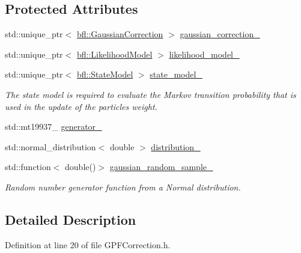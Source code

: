 \subsection*{Protected Attributes}
\begin{DoxyCompactItemize}
\item 
std\+::unique\+\_\+ptr$<$ \mbox{\hyperlink{classbfl_1_1GaussianCorrection}{bfl\+::\+Gaussian\+Correction}} $>$ \mbox{\hyperlink{classbfl_1_1GPFCorrection_a43295a0619fa021b6b314c76f046bae8}{gaussian\+\_\+correction\+\_\+}}
\item 
std\+::unique\+\_\+ptr$<$ \mbox{\hyperlink{classbfl_1_1LikelihoodModel}{bfl\+::\+Likelihood\+Model}} $>$ \mbox{\hyperlink{classbfl_1_1GPFCorrection_aabbf55b6addf12146ffd7da12c5475bf}{likelihood\+\_\+model\+\_\+}}
\item 
std\+::unique\+\_\+ptr$<$ \mbox{\hyperlink{classbfl_1_1StateModel}{bfl\+::\+State\+Model}} $>$ \mbox{\hyperlink{classbfl_1_1GPFCorrection_a7b979b09abf016f4e5a0d9f0d5a84917}{state\+\_\+model\+\_\+}}
\begin{DoxyCompactList}\small\item\em The state model is required to evaluate the Markov transition probability that is used in the update of the particles weight. \end{DoxyCompactList}\item 
std\+::mt19937\+\_ \mbox{\hyperlink{classbfl_1_1GPFCorrection_ac1021f6b12969d08231bcefdd0303f80}{generator\+\_\+}}
\item 
std\+::normal\+\_\+distribution$<$ double $>$ \mbox{\hyperlink{classbfl_1_1GPFCorrection_a9d2f1ed3b529e340e5d019d80e572d8d}{distribution\+\_\+}}
\item 
std\+::function$<$ double()$>$ \mbox{\hyperlink{classbfl_1_1GPFCorrection_acec1a6f0c4634b864bc4d22d7f861307}{gaussian\+\_\+random\+\_\+sample\+\_\+}}
\begin{DoxyCompactList}\small\item\em Random number generator function from a Normal distribution. \end{DoxyCompactList}\end{DoxyCompactItemize}


\subsection{Detailed Description}


Definition at line 20 of file G\+P\+F\+Correction.\+h.




